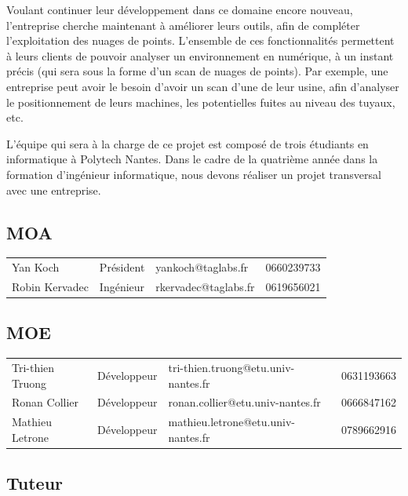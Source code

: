 \documentclass[12pt,titlepage,french]{article}
\begin{document}
Voulant continuer leur développement dans ce domaine encore nouveau, l'entreprise cherche maintenant à améliorer leurs outils, afin de compléter l'exploitation des nuages de points. L'ensemble de ces fonctionnalités permettent à leurs clients de pouvoir analyser un environnement en numérique, à un instant précis (qui sera sous la forme d'un scan de nuages de points). Par exemple, une entreprise peut avoir le besoin d'avoir un scan d'une de leur usine, afin d'analyser le positionnement de leurs machines, les potentielles fuites au niveau des tuyaux, etc.

L'équipe qui sera à la charge de ce projet est composé de trois étudiants en informatique à Polytech Nantes. Dans le cadre de la quatrième année dans la formation d'ingénieur informatique, nous devons réaliser un projet transversal avec une entreprise.
\subsection*{MOA}

\noindent\begin{tabu} to \textwidth {X[c]X[c]X[c]X[c]}\toprule
   &&        &\\\toprule
      Yan Koch&   Président&  yankoch@taglabs.fr&    0660239733\\\midrule
Robin Kervadec&   Ingénieur&rkervadec@taglabs.fr&    0619656021\\\bottomrule
\end{tabu}

\subsection*{MOE}

\noindent\begin{tabu} to \textwidth {X[c2]X[c]X[c3]X[c]}\toprule
     &&                       &\\\toprule
Tri-thien Truong& Développeur&tri-thien.truong@etu.univ-nantes.fr&    0631193663\\\midrule
   Ronan Collier& Développeur&   ronan.collier@etu.univ-nantes.fr&    0666847162\\\midrule
 Mathieu Letrone& Développeur& mathieu.letrone@etu.univ-nantes.fr&    0789662916\\\bottomrule
\end{tabu}

\subsection*{Tuteur}
\end{document}
